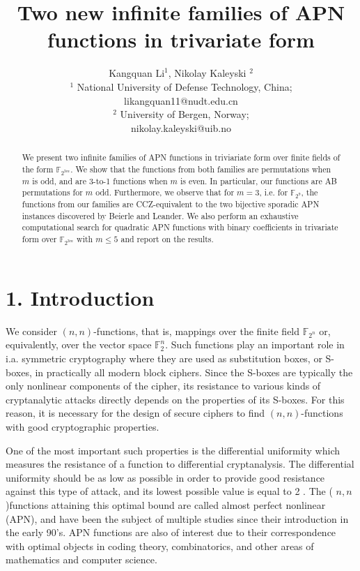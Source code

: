 \documentclass[10pt]{article}
\title{Two new infinite families of APN functions in trivariate form }
\author{Kangquan $\mathrm{Li}^{1}$, Nikolay Kaleyski ${ }^{2}$\\
${ }^{1}$ National University of Defense Technology, China;\\
likangquan11@nudt.edu.cn\\
${ }^{2}$ University of Bergen, Norway;\\
nikolay.kaleyski@uib.no}
\date{}
\begin{document}
\maketitle
\captionsetup{singlelinecheck=false}


\begin{abstract}
We present two infinite families of APN functions in triviariate form over finite fields of the form $\mathbb{F}_{2^{3 m}}$. We show that the functions from both families are permutations when $m$ is odd, and are 3-to-1 functions when $m$ is even. In particular, our functions are AB permutations for $m$ odd. Furthermore, we observe that for $m=3$, i.e. for $\mathbb{F}_{2^{9}}$, the functions from our families are CCZ-equivalent to the two bijective sporadic APN instances discovered by Beierle and Leander. We also perform an exhaustive computational search for quadratic APN functions with binary coefficients in trivariate form over $\mathbb{F}_{2^{3 m}}$ with $m \leq 5$ and report on the results.
\end{abstract}

\section*{1. Introduction}
We consider $(n, n)$-functions, that is, mappings over the finite field $\mathbb{F}_{2^{n}}$ or, equivalently, over the vector space $\mathbb{F}_{2}^{n}$. Such functions play an important role in i.a. symmetric cryptography where they are used as substitution boxes, or S-boxes, in practically all modern block ciphers. Since the S-boxes are typically the only nonlinear components of the cipher, its resistance to various kinds of cryptanalytic attacks directly depends on the properties of its S-boxes. For this reason, it is necessary for the design of secure ciphers to find $(n, n)$-functions with good cryptographic properties.

One of the most important such properties is the differential uniformity which measures the resistance of a function to differential cryptanalysis. The differential uniformity should be as low as possible in order to provide good resistance against this type of attack, and its lowest possible value is equal to 2 . The ( $n, n$ )functions attaining this optimal bound are called almost perfect nonlinear (APN), and have been the subject of multiple studies since their introduction in the early 90's. APN functions are also of interest due to their correspondence with optimal objects in coding theory, combinatorics, and other areas of mathematics and computer science.
\end{document}
